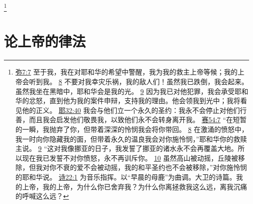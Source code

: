 \documentclass[12pt, a4paper, oneside]{ctexart}
\begin{document}
	\footnote {
		\href{https://biblehub.com/micah/7-7.htm}{弥7:7} 至于我，我在对耶和华的希望中警醒，我为我的救主上帝等候；我的上帝会听到我。
		\href{https://biblehub.com/micah/7-8.htm}{8} 不要对我幸灾乐祸，我的敌人们！虽然我已跌倒，我会起来。虽然我坐在黑暗中，耶和华会是我的光。
		\href{https://biblehub.com/micah/7-9.htm}{9} 因为我已对他犯罪，我会承受耶和华的忿怒，直到他为我的案件申辩，支持我的理由。他会领我到光中；我将看见他的正义。
		\href{https://biblehub.com/jeremiah/32-40.htm}{耶32:40} 我会与他们立一个永久的圣约：我永不会停止对他们行善，而且我会启发他们敬畏我，以致他们永不会转身离开我。
		\href{https://biblehub.com/isaiah/54-7.htm}{赛54:7} “在短暂的一瞬，我抛弃了你，但带着深深的怜悯我会将你带回。
		\href{https://biblehub.com/isaiah/54-8.htm}{8} 在激涌的愤怒中，我一时向你隐藏我的面，但带着永久的温良我会对你施怜悯，”耶和华你的救赎主说。
		\href{https://biblehub.com/isaiah/54-9.htm}{9} “这对我像挪亚的日子，我发誓了挪亚的诸水永不会再覆盖大地。所以现在我已发誓不对你愤怒，永不再训斥你。
		\href{https://biblehub.com/isaiah/54-10.htm}{10} 虽然高山被动摇，丘陵被移除，但我对你不衰的爱不会被动摇，我的和平圣约也不会被移除，”对你施怜悯的耶和华说。
		\href{https://biblehub.com/psalms/22-1.htm}{诗22:1} 为音乐指挥。以“早晨的母鹿”为曲调。大卫的诗篇。我的上帝，我的上帝，为什么你已舍弃我？为什么你离拯救我这么远，离我沉痛的呼喊这么远？
	}

\section{论上帝的律法}
\end{document}
